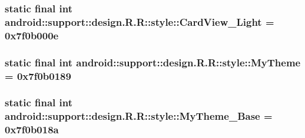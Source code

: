 \hypertarget{classandroid_1_1support_1_1design_1_1_r_1_1style_763cf69393aace3fa558b63fef9c0692}{
\subsubsection[{CardView\_\-Light}]{\setlength{\rightskip}{0pt plus 5cm}static final int android::support::design.R.R::style::CardView\_\-Light = 0x7f0b000e}}
\label{classandroid_1_1support_1_1design_1_1_r_1_1style_763cf69393aace3fa558b63fef9c0692}


\hypertarget{classandroid_1_1support_1_1design_1_1_r_1_1style_ca5a8627a9941171b41b9e027f7f97d4}{
\subsubsection[{MyTheme}]{\setlength{\rightskip}{0pt plus 5cm}static final int android::support::design.R.R::style::MyTheme = 0x7f0b0189}}
\label{classandroid_1_1support_1_1design_1_1_r_1_1style_ca5a8627a9941171b41b9e027f7f97d4}


\hypertarget{classandroid_1_1support_1_1design_1_1_r_1_1style_cc9764123f6019c6f462188ce848193e}{
\subsubsection[{MyTheme\_\-Base}]{\setlength{\rightskip}{0pt plus 5cm}static final int android::support::design.R.R::style::MyTheme\_\-Base = 0x7f0b018a}}
\label{classandroid_1_1support_1_1design_1_1_r_1_1style_cc9764123f6019c6f462188ce848193e}


